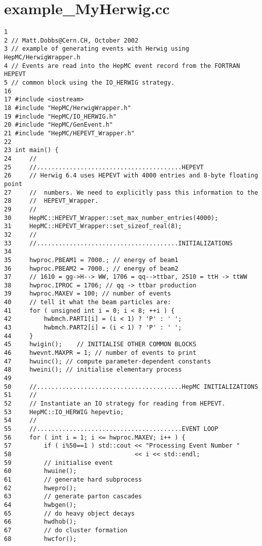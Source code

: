 \section{example\_\-My\-Herwig.cc}


\begin{DocInclude}\begin{verbatim}1 
2 // Matt.Dobbs@Cern.CH, October 2002
3 // example of generating events with Herwig using HepMC/HerwigWrapper.h 
4 // Events are read into the HepMC event record from the FORTRAN HEPEVT 
5 // common block using the IO_HERWIG strategy.
16 
17 #include <iostream>
18 #include "HepMC/HerwigWrapper.h"
19 #include "HepMC/IO_HERWIG.h"
20 #include "HepMC/GenEvent.h"
21 #include "HepMC/HEPEVT_Wrapper.h"
22 
23 int main() { 
24     //
25     //........................................HEPEVT
26     // Herwig 6.4 uses HEPEVT with 4000 entries and 8-byte floating point
27     //  numbers. We need to explicitly pass this information to the 
28     //  HEPEVT_Wrapper.
29     //
30     HepMC::HEPEVT_Wrapper::set_max_number_entries(4000);
31     HepMC::HEPEVT_Wrapper::set_sizeof_real(8);
32     //
33     //.......................................INITIALIZATIONS
34 
35     hwproc.PBEAM1 = 7000.; // energy of beam1
36     hwproc.PBEAM2 = 7000.; // energy of beam2
37     // 1610 = gg->H--> WW, 1706 = qq-->ttbar, 2510 = ttH -> ttWW
38     hwproc.IPROC = 1706; // qq -> ttbar production 
39     hwproc.MAXEV = 100; // number of events
40     // tell it what the beam particles are:
41     for ( unsigned int i = 0; i < 8; ++i ) {
42         hwbmch.PART1[i] = (i < 1) ? 'P' : ' ';
43         hwbmch.PART2[i] = (i < 1) ? 'P' : ' ';
44     }
45     hwigin();    // INITIALISE OTHER COMMON BLOCKS
46     hwevnt.MAXPR = 1; // number of events to print
47     hwuinc(); // compute parameter-dependent constants
48     hweini(); // initialise elementary process
49 
50     //........................................HepMC INITIALIZATIONS
51     //
52     // Instantiate an IO strategy for reading from HEPEVT.
53     HepMC::IO_HERWIG hepevtio;
54     //
55     //........................................EVENT LOOP
56     for ( int i = 1; i <= hwproc.MAXEV; i++ ) {
57         if ( i%50==1 ) std::cout << "Processing Event Number " 
58                                  << i << std::endl;
59         // initialise event
60         hwuine();
61         // generate hard subprocess
62         hwepro();
63         // generate parton cascades
64         hwbgen();
65         // do heavy object decays
66         hwdhob();
67         // do cluster formation
68         hwcfor();

\end{verbatim}
\end{DocInclude}
